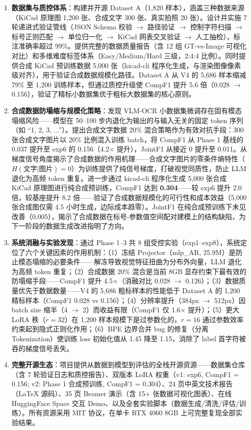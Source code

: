 \begin{enumerate}
    \item \textbf{数据集与质控体系}：构建并开源 Dataset A（1,820 样本），涵盖三种数据来源（KiCad 原理图 1,200 张、合成文字 300 张、真实拍照 20 张）。设计并实施 7 轮递进式验证管线（JSON Schema 校验 $\to$ 路径验证 $\to$ 控制字符扫描 $\to$ 标号正则匹配 $\to$ 单位归一化 $\to$ KiCad 网表交叉验证 $\to$ 人工抽检），标注准确率超过 99\%。提供完整的数据质量报告（含 12 组 GT-vs-Image 可视化对比）和多维难度标签体系（Easy/Medium/Hard 三级，2:4:4 比例）。同时提供合成 KiCad 预训练数据 5,000 张（kicad-cli 程序化生成，与渲染图像像素级对齐），用于验证合成数据规模化路径。Dataset A 从 V4 的 5,686 样本缩减 79\% 至 1,200 训练样本，但通过质控升级使 CompF1 提升 5.6 倍（0.028 $\to$ 0.156），验证了精标小数据集优于粗标大数据集的核心原则。

    \item \textbf{合成数据防塌缩与规模化策略}：发现 VLM-OCR 小数据集微调存在固有模态塌缩风险——模型在 50--100 步内退化为输出的与输入无关的固定 token 序列（如 ``1, 2, 3, ...''）。提出合成文字数据 20\% 混合策略作为有效对抗手段：300 张合成文字图片以 20\% 比例混入训练 batch，将 CompF1 从 Phase 1 基线的 0.037 提升至 exp6 的 0.156（4.2$\times$ 提升），JointF1 从接近 0 提升至 0.011。从梯度信号角度揭示了合成数据的作用机理——合成文字图片的零条件熵特性（$H(\text{文字}|\text{图片}) = 0$）为训练提供了纯信号梯度，打破视觉同质性，防止 LLM 退化为高频 token 重复。进一步通过 kicad-cli 程序化生成 5,000 张合成 KiCad 原理图进行纯合成预训练，CompF1 达到 \textbf{0.304}——较 exp6 提升 2.0 倍，较基座提升 8.2 倍——验证了合成数据规模化的可行性和成本效益（5,000 张合成图仅需 4.5 小时生成，边际成本趋零）。JointF1 在纯合成预训练下未见改善（0.005），揭示了合成数据在标号-参数值空间配对建模上的结构缺陷，为下一阶段的数据生成改进指明了方向。

    \item \textbf{系统消融与实验发现}：通过 Phase 1--3 共 8 组受控实验（exp1--exp8），系统定位了六个关键因素的作用机制：（1）冻结 Projector（mlp\_AR, 25.9M）是防止模态塌缩的必要条件——解冻导致视觉特征扭曲为分布外向量，LLM 退化为高频 token 重复；（2）合成数据 20\% 混合是当前 8GB 显存约束下最有效的防塌缩手段——CompF1 提升 4.5$\times$（消融对比 0.028 $\to$ 0.126）；（3）数据质量优先于数据数量——V4 的 5,686 粗标样本的性能低于 Dataset A 的 1,200 精标样本（CompF1 0.028 vs 0.156）；（4）分辨率提升（384px $\to$ 512px）因 batch size 缩半（4 $\to$ 2）而收益有限（CompF1 仅 1.6$\times$ 提升）；（5）更大 LoRA 秩（$r=32$）在 1,200 样本规模下是过参数化的，$r=16$ 通过参数效率约束起到隐式正则化作用；（6）BPE 边界合并 bug 的修复（分离 Tokenization）使训练 loss 初始化值从 1.45 降至 1.15，消除了 label 首字符被吞的梯度信号丢失。

    \item \textbf{完整开源生态}：项目提供从数据到模型到评估的全栈开源资源——数据集仓库（含 7 轮验证日志和质控报告）、双版本 LoRA 权重（v1: exp6, CompF1 = 0.156; v2: Phase 1 合成预训练, CompF1 = 0.304）、24 页中英文技术报告（LaTeX 源码）、35 页 Beamer 演示（含 15+ 张数据可视化图表）、在线 HuggingFace Space 交互 Demo、以及全套实验脚本（数据生成/清洗/评估/训练）。所有资源采用 MIT 协议，在单卡 RTX 4060 8GB 上可完整复现全部实验结果。
\end{enumerate}

